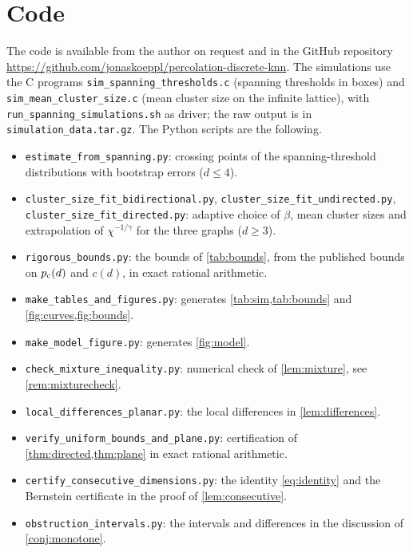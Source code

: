 \documentclass[11pt,letterpaper]{article}
\begin{document}
\section*{Code}
{\raggedright The code is available from the author on request and in the GitHub repository \url{https://github.com/jonaskoeppl/percolation-discrete-knn}. The simulations use the C programs \texttt{sim\_spanning\_thresholds.c} (spanning thresholds in boxes) and \texttt{sim\_mean\_cluster\_size.c} (mean cluster size on the infinite lattice), with \texttt{run\_spanning\_simulations.sh} as driver; the raw output is in \texttt{simulation\_data.tar.gz}. The Python scripts are the following.
\begin{itemize}
\item \texttt{estimate\_from\_spanning.py}: crossing points of the spanning-threshold distributions with bootstrap errors ($d\le4$).
\item \texttt{cluster\_size\_fit\_bidirectional.py}, \texttt{cluster\_size\_fit\_undirected.py}, \texttt{cluster\_size\_fit\_directed.py}: adaptive choice of $\beta$, mean cluster sizes and extrapolation of $\chi^{-1/\gamma}$ for the three graphs ($d\ge3$).
\item \texttt{rigorous\_bounds.py}: the bounds of \cref{tab:bounds}, from the published bounds on $p_{\mathrm c}(d)$ and $c(d)$, in exact rational arithmetic.
\item \texttt{make\_tables\_and\_figures.py}: generates \cref{tab:sim,tab:bounds} and \cref{fig:curves,fig:bounds}.
\item \texttt{make\_model\_figure.py}: generates \cref{fig:model}.
\item \texttt{check\_mixture\_inequality.py}: numerical check of \cref{lem:mixture}, see \cref{rem:mixturecheck}.
\item \texttt{local\_differences\_planar.py}: the local differences in \cref{lem:differences}.
\item \texttt{verify\_uniform\_bounds\_and\_plane.py}: certification of \cref{thm:directed,thm:plane} in exact rational arithmetic.
\item \texttt{certify\_consecutive\_dimensions.py}: the identity \eqref{eq:identity} and the Bernstein certificate in the proof of \cref{lem:consecutive}.
\item \texttt{obstruction\_intervals.py}: the intervals and differences in the discussion of \cref{conj:monotone}.
\end{itemize}
\par}



\end{document}
